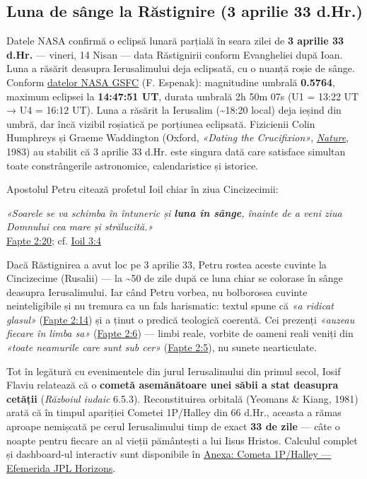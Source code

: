 \documentclass[12pt,a4paper,twoside,openany]{book}
\begin{document}
\subsection{Luna de sânge la Răstignire (3 aprilie 33 d.Hr.)}
Datele NASA confirmă o eclipsă lunară parțială în seara zilei de \textbf{3 aprilie 33 d.Hr.} — vineri, 14 Nisan — data Răstignirii conform Evangheliei după Ioan. Luna a răsărit deasupra Ierusalimului deja eclipsată, cu o nuanță roșie de sânge. Conform \href{https://eclipse.gsfc.nasa.gov/LEhistory/LEplot/LE0033Apr03P.pdf}{datelor NASA GSFC} (F. Espenak): magnitudine umbrală \textbf{0.5764}, maximum eclipsei la \textbf{14:47:51 UT}, durata umbrală 2h 50m 07s (U1 = 13:22 UT → U4 = 16:12 UT). Luna a răsărit la Ierusalim (\textasciitilde{}18:20 local) deja ieșind din umbră, dar încă vizibil roșiatică pe porțiunea eclipsată. Fizicienii Colin Humphreys și Graeme Waddington (Oxford, \textit{«Dating the Crucifixion»}, \href{https://www.nature.com/articles/306743a0}{\textit{Nature}}, 1983) au stabilit că 3 aprilie 33 d.Hr. este singura dată care satisface simultan toate constrângerile astronomice, calendaristice și istorice.

Apostolul Petru citează profetul Ioil chiar în ziua Cincizecimii:


\begin{biblequote}
\textit{«Soarele se va schimba în întuneric și \textbf{luna în sânge}, înainte de a veni ziua Domnului cea mare și strălucită.»}
 \\
{\small\color{gray}\href{https://bibliaortodoxa.ro/carte.php?id=26\&cap=2\#20}{Fapte 2:20}; cf. \href{https://bibliaortodoxa.ro/carte.php?id=42\&cap=3\#4}{Ioil 3:4}}
\end{biblequote}
Dacă Răstignirea a avut loc pe 3 aprilie 33, Petru rostea aceste cuvinte la Cincizecime (Rusalii) — la \textasciitilde{}50 de zile după ce luna chiar se colorase în sânge deasupra Ierusalimului. Iar când Petru vorbea, nu bolborosea cuvinte neinteligibile și nu tremura ca un fals harismatic: textul spune că \textit{«a ridicat glasul»} (\href{https://bibliaortodoxa.ro/carte.php?id=26\&cap=2\#14}{Fapte 2:14}) și a ținut o predică teologică coerentă. Cei prezenți \textit{«auzeau fiecare în limba sa»} (\href{https://bibliaortodoxa.ro/carte.php?id=26\&cap=2\#6}{Fapte 2:6}) — limbi reale, vorbite de oameni reali veniți din \textit{«toate neamurile care sunt sub cer»} (\href{https://bibliaortodoxa.ro/carte.php?id=26\&cap=2\#5}{Fapte 2:5}), nu sunete nearticulate.

Tot în legătură cu evenimentele din jurul Ierusalimului din primul secol, Iosif Flaviu relatează că o \textbf{cometă asemănătoare unei săbii a stat deasupra cetății} (\textit{Războiul iudaic} 6.5.3). Reconstituirea orbitală (Yeomans \& Kiang, 1981) arată că în timpul apariției Cometei 1P/Halley din 66 d.Hr., aceasta a rămas aproape nemișcată pe cerul Ierusalimului timp de exact \textbf{33 de zile} — câte o noapte pentru fiecare an al vieții pământești a lui Iisus Hristos. Calculul complet și dashboard-ul interactiv sunt disponibile în \href{\#halley}{Anexa: Cometa 1P/Halley — Efemerida JPL Horizons}.
\end{document}

